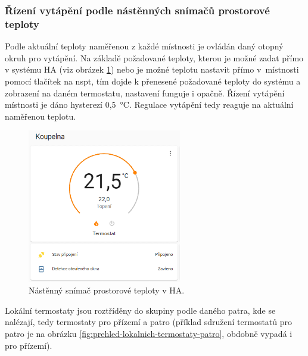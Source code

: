 \subsubsection{Řízení vytápění podle nástěnných snímačů prostorové teploty}
\label{sec:rizeni-vytapeni-podle-nastennych-snimacu-prostorove-teploty}
Podle aktuální teploty naměřenou z každé místnosti je ovládán daný otopný okruh pro vytápění. Na základě požadované teploty, kterou je možné zadat přímo v systému HA (viz obrázek \ref{fig:lokalni-termostat-ha}) nebo je možné teplotu nastavit přímo v~místnosti pomocí tlačítek na \acrshort{nspt}, tím dojde k přenesené požadované teploty do systému a zobrazení na daném termostatu, nastavení funguje i opačně. Řízení vytápění místnosti je dáno hysterezí 0,5~°C. Regulace vytápění tedy reaguje na aktuální naměřenou teplotu.

\begin{figure}[H]
    \centering
    \includegraphics[width=0.6\textwidth]{images/software-ha/lokalni-termostat-ha.png}
    \caption{Nástěnný snímač prostorové teploty v HA.}
    \label{fig:lokalni-termostat-ha}
\end{figure}

Lokální termostaty jsou roztříděny do skupiny podle daného patra, kde se nalézají, tedy termostaty pro přízemí a patro (příklad sdružení termostatů pro patro je na obrázku \ref{fig:prehled-lokalnich-termostaty-patro}, obdobně vypadá i pro přízemí).

